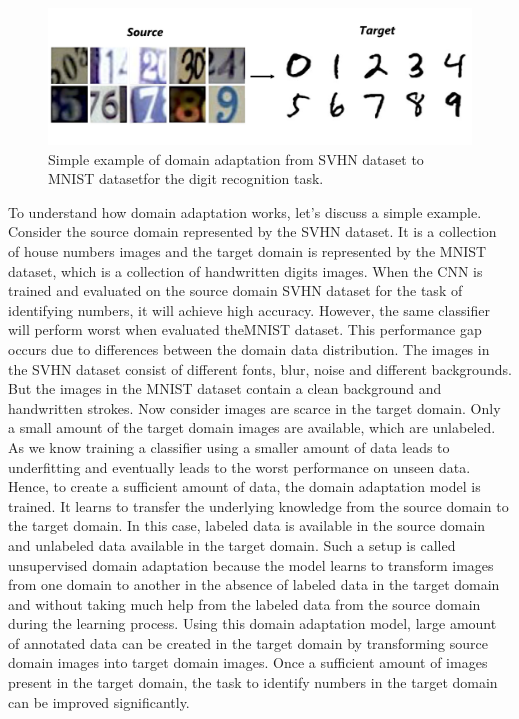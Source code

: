 \begin{figure}[H]
        \begin{center}
 	    \includegraphics[scale=0.15]{images/Introduction/DA.png}
	    \caption[Simple example of domain adaptation from \ac{SVHN} dataset to \ac{MNIST} dataset for the digit recognition task.]{Simple example of domain adaptation from \ac{SVHN} dataset \cite{37648} to \ac{MNIST} dataset\footnotemark for the digit recognition task.\footnotemark}
	    \label{fig:DA}
	    \end{center}
\end{figure}


To understand how domain adaptation works, let's discuss a simple example. Consider the source domain represented by the \ac{SVHN} dataset. It is a collection of house numbers images and the target domain is represented by the \ac{MNIST} dataset, which is a collection of handwritten digits images. When the \ac{CNN} is trained and evaluated on the source domain \ac{SVHN} dataset for the task of identifying numbers, it will achieve high accuracy. However, the same classifier will perform worst when evaluated the\ac{MNIST} dataset. This performance gap occurs due to differences between the domain data distribution. The images in the \ac{SVHN} dataset consist of different fonts, blur, noise and different backgrounds. But the images in the \ac{MNIST} dataset contain a clean background and handwritten strokes. Now consider images are scarce in the target domain. Only a small amount of the target domain images are available, which are unlabeled. As we know training a classifier using a smaller amount of data leads to underfitting and eventually leads to the worst performance on unseen data. Hence, to create a sufficient amount of data, the domain adaptation model is trained. It learns to transfer the underlying knowledge from the source domain to the target domain. In this case, labeled data is available in the source domain and unlabeled data available in the target domain. Such a setup is called unsupervised domain adaptation because the model learns to transform images from one domain to another in the absence of labeled data in the target domain and without taking much help from the labeled data from the source domain during the learning process. Using this domain adaptation model, large amount of annotated data can be created in the target domain by transforming source domain images into target domain images. Once a sufficient amount of images present in the target domain, the task to identify numbers in the target domain can be improved significantly. 



